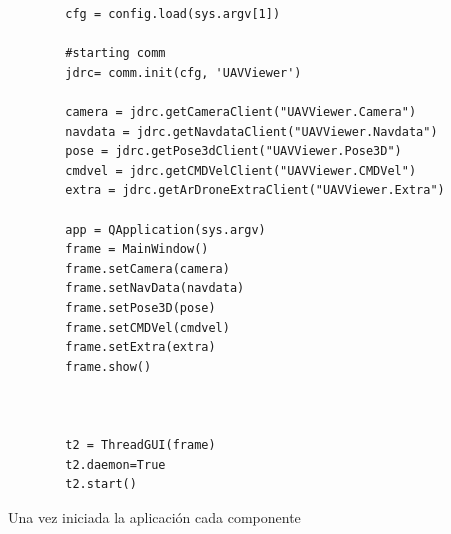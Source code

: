 {\scriptsize
\begin{verbatim}
        cfg = config.load(sys.argv[1])

        #starting comm
        jdrc= comm.init(cfg, 'UAVViewer')

        camera = jdrc.getCameraClient("UAVViewer.Camera")
        navdata = jdrc.getNavdataClient("UAVViewer.Navdata")
        pose = jdrc.getPose3dClient("UAVViewer.Pose3D")
        cmdvel = jdrc.getCMDVelClient("UAVViewer.CMDVel")
        extra = jdrc.getArDroneExtraClient("UAVViewer.Extra")

        app = QApplication(sys.argv)
        frame = MainWindow()
        frame.setCamera(camera)
        frame.setNavData(navdata)
        frame.setPose3D(pose)
        frame.setCMDVel(cmdvel)
        frame.setExtra(extra)
        frame.show()



        t2 = ThreadGUI(frame)
        t2.daemon=True
        t2.start()
\end{verbatim}}

Una vez iniciada la aplicación cada componente